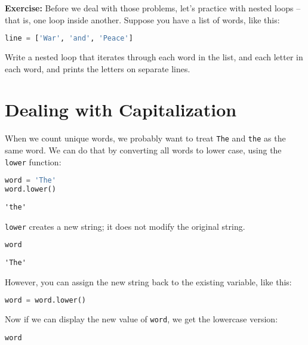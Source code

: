 \textbf{Exercise:} Before we deal with those problems, let's practice
with nested loops -- that is, one loop inside another. Suppose you have
a list of words, like this:

\begin{lstlisting}[language=Python,style=source]
line = ['War', 'and', 'Peace']
\end{lstlisting}

Write a nested loop that iterates through each word in the list, and
each letter in each word, and prints the letters on separate lines.

\section{Dealing with Capitalization}\label{dealing-with-capitalization}

When we count unique words, we probably want to treat
\passthrough{\lstinline!The!} and \passthrough{\lstinline!the!} as the
same word. We can do that by converting all words to lower case, using
the \passthrough{\lstinline!lower!} function:

\begin{lstlisting}[language=Python,style=source]
word = 'The'
word.lower()
\end{lstlisting}

\begin{lstlisting}[style=output]
'the'
\end{lstlisting}

\passthrough{\lstinline!lower!} creates a new string; it does not modify
the original string.

\begin{lstlisting}[language=Python,style=source]
word
\end{lstlisting}

\begin{lstlisting}[style=output]
'The'
\end{lstlisting}

However, you can assign the new string back to the existing variable,
like this:

\begin{lstlisting}[language=Python,style=source]
word = word.lower()
\end{lstlisting}

Now if we can display the new value of \passthrough{\lstinline!word!},
we get the lowercase version:

\begin{lstlisting}[language=Python,style=source]
word
\end{lstlisting}

